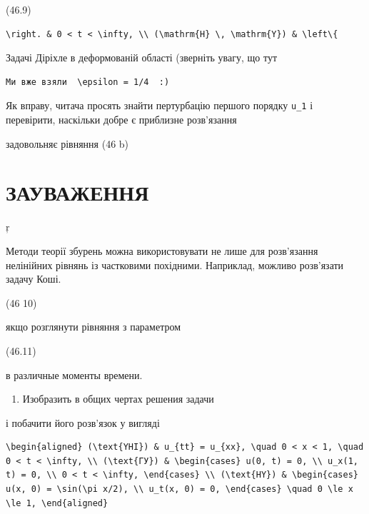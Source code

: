 \documentclass[
  ukrainian,
]{article}
\providecommand{\tightlist}{%
  \setlength{\itemsep}{0pt}\setlength{\parskip}{0pt}}
\begin{document}
(46.9)

\begin{verbatim}
\right. & 0 < t < \infty, \\ (\mathrm{H} \, \mathrm{Y}) & \left\{
\end{verbatim}

Задачі Діріхле в деформованій області (зверніть увагу, що тут

\begin{verbatim}
Ми вже взяли  \epsilon = 1/4  :)
\end{verbatim}

Як вправу, читача просять знайти пертурбацію першого порядку
\texttt{u\_1} і перевірити, наскільки добре є приблизне розв'язання

задовольняє рівняння (46 b)

\section{ЗАУВАЖЕННЯ}\label{ux437ux430ux443ux432ux430ux436ux435ux43dux43dux44f-6}

ŗ

Методи теорії збурень можна використовувати не лише для розв'язання
нелінійних рівнянь із частковими похідними. Наприклад, можливо
розв'язати задачу Коші.

(46 10)

якщо розглянути рівняння з параметром

(46.11)

в различные моменты времени.

\begin{enumerate}
\def\labelenumi{\arabic{enumi}.}
\setcounter{enumi}{1}
\tightlist
\item
  Изобразить в общих чертах решения задачи
\end{enumerate}

і побачити його розв'язок у вигляді

\begin{verbatim}
\begin{aligned} (\text{YHI}) & u_{tt} = u_{xx}, \quad 0 < x < 1, \quad 0 < t < \infty, \\ (\text{ГУ}) & \begin{cases} u(0, t) = 0, \\ u_x(1, t) = 0, \\ 0 < t < \infty, \end{cases} \\ (\text{HY}) & \begin{cases} u(x, 0) = \sin(\pi x/2), \\ u_t(x, 0) = 0, \end{cases} \quad 0 \le x \le 1, \end{aligned}
\end{verbatim}
\end{document}
